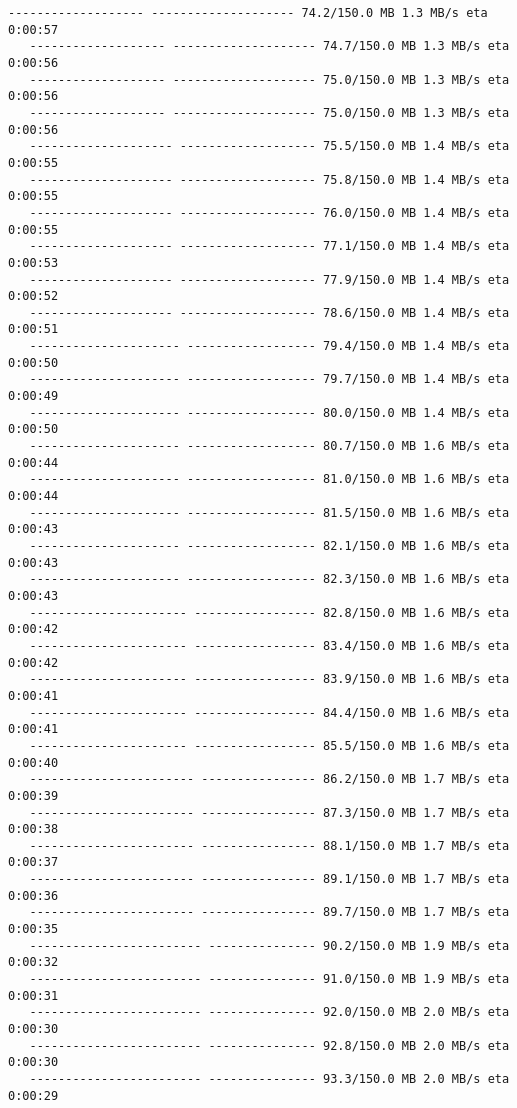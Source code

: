 \documentclass[11pt]{article}
\begin{document}
\begin{Verbatim}[commandchars=\\\{\}]
   ------------------- -------------------- 74.2/150.0 MB 1.3 MB/s eta 0:00:57
   ------------------- -------------------- 74.7/150.0 MB 1.3 MB/s eta 0:00:56
   ------------------- -------------------- 75.0/150.0 MB 1.3 MB/s eta 0:00:56
   ------------------- -------------------- 75.0/150.0 MB 1.3 MB/s eta 0:00:56
   -------------------- ------------------- 75.5/150.0 MB 1.4 MB/s eta 0:00:55
   -------------------- ------------------- 75.8/150.0 MB 1.4 MB/s eta 0:00:55
   -------------------- ------------------- 76.0/150.0 MB 1.4 MB/s eta 0:00:55
   -------------------- ------------------- 77.1/150.0 MB 1.4 MB/s eta 0:00:53
   -------------------- ------------------- 77.9/150.0 MB 1.4 MB/s eta 0:00:52
   -------------------- ------------------- 78.6/150.0 MB 1.4 MB/s eta 0:00:51
   --------------------- ------------------ 79.4/150.0 MB 1.4 MB/s eta 0:00:50
   --------------------- ------------------ 79.7/150.0 MB 1.4 MB/s eta 0:00:49
   --------------------- ------------------ 80.0/150.0 MB 1.4 MB/s eta 0:00:50
   --------------------- ------------------ 80.7/150.0 MB 1.6 MB/s eta 0:00:44
   --------------------- ------------------ 81.0/150.0 MB 1.6 MB/s eta 0:00:44
   --------------------- ------------------ 81.5/150.0 MB 1.6 MB/s eta 0:00:43
   --------------------- ------------------ 82.1/150.0 MB 1.6 MB/s eta 0:00:43
   --------------------- ------------------ 82.3/150.0 MB 1.6 MB/s eta 0:00:43
   ---------------------- ----------------- 82.8/150.0 MB 1.6 MB/s eta 0:00:42
   ---------------------- ----------------- 83.4/150.0 MB 1.6 MB/s eta 0:00:42
   ---------------------- ----------------- 83.9/150.0 MB 1.6 MB/s eta 0:00:41
   ---------------------- ----------------- 84.4/150.0 MB 1.6 MB/s eta 0:00:41
   ---------------------- ----------------- 85.5/150.0 MB 1.6 MB/s eta 0:00:40
   ----------------------- ---------------- 86.2/150.0 MB 1.7 MB/s eta 0:00:39
   ----------------------- ---------------- 87.3/150.0 MB 1.7 MB/s eta 0:00:38
   ----------------------- ---------------- 88.1/150.0 MB 1.7 MB/s eta 0:00:37
   ----------------------- ---------------- 89.1/150.0 MB 1.7 MB/s eta 0:00:36
   ----------------------- ---------------- 89.7/150.0 MB 1.7 MB/s eta 0:00:35
   ------------------------ --------------- 90.2/150.0 MB 1.9 MB/s eta 0:00:32
   ------------------------ --------------- 91.0/150.0 MB 1.9 MB/s eta 0:00:31
   ------------------------ --------------- 92.0/150.0 MB 2.0 MB/s eta 0:00:30
   ------------------------ --------------- 92.8/150.0 MB 2.0 MB/s eta 0:00:30
   ------------------------ --------------- 93.3/150.0 MB 2.0 MB/s eta 0:00:29

\end{Verbatim}
\end{document}
